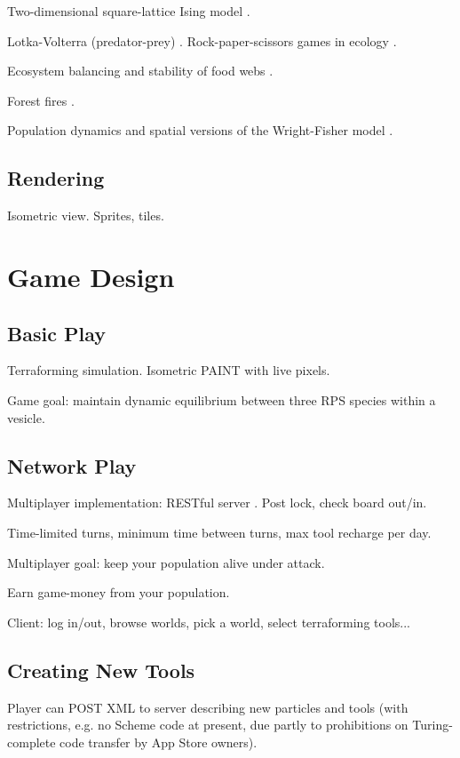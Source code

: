 \documentclass{acm_proc_article-sp}
\begin{document}
Two-dimensional square-lattice Ising model \cite{Onsager1944}.

Lotka-Volterra (predator-prey) \cite{Lotka1910,Hirota199739}.
Rock-paper-scissors games in ecology \cite{Tainaka2000}.

Ecosystem balancing and stability of food webs \cite{quince2005topological}.

Forest fires \cite{Karafyllidis1997}.

Population dynamics and spatial versions of the Wright-Fisher model \cite{MathiesonMcVean2013}.

\subsection{Rendering}

Isometric view.
Sprites, tiles.

\section{Game Design}

\subsection{Basic Play}

Terraforming simulation.
Isometric PAINT with live pixels.

Game goal: maintain dynamic equilibrium between three RPS species within a vesicle.

\subsection{Network Play}

Multiplayer implementation: RESTful server \cite{rest}.
Post lock, check board out/in.

Time-limited turns, minimum time between turns, max tool recharge per day.

Multiplayer goal: keep your population alive under attack.

Earn game-money from your population.

Client: log in/out, browse worlds, pick a world, select terraforming tools...

\subsection{Creating New Tools}

Player can POST XML to server describing new particles and tools
(with restrictions, e.g. no Scheme code at present, due partly to prohibitions on Turing-complete code transfer by App Store owners).
\end{document}
